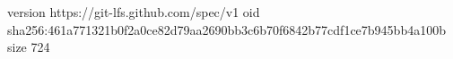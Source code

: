 version https://git-lfs.github.com/spec/v1
oid sha256:461a771321b0f2a0ce82d79aa2690bb3c6b70f6842b77cdf1ce7b945bb4a100b
size 724
